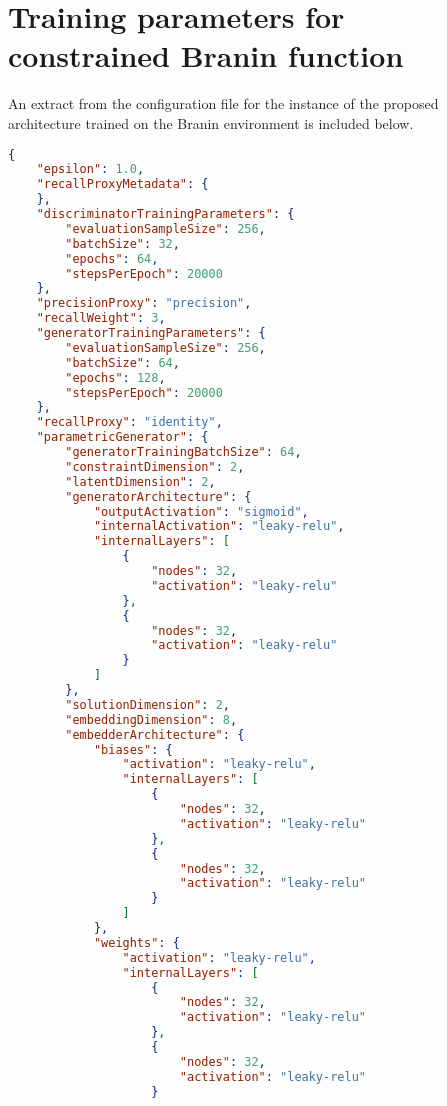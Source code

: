 \documentclass[../main.tex]{subfiles}
\begin{document}
\section{Training parameters for constrained Branin function} \label{appendix:braninTrainingParameters}

An extract from the configuration file for the instance of the proposed architecture trained on the Branin environment is included below.

\begin{lstlisting}[language=json,firstnumber=1,caption={Experimental parameters for training a generator on the constrained Branin function environment.},captionpos=b]
{  
    "epsilon": 1.0,
    "recallProxyMetadata": {
    },
    "discriminatorTrainingParameters": {  
        "evaluationSampleSize": 256,
        "batchSize": 32,
        "epochs": 64,
        "stepsPerEpoch": 20000
    },
    "precisionProxy": "precision",
    "recallWeight": 3,
    "generatorTrainingParameters": {  
        "evaluationSampleSize": 256,
        "batchSize": 64,
        "epochs": 128,
        "stepsPerEpoch": 20000
    },
    "recallProxy": "identity",
    "parametricGenerator": {  
        "generatorTrainingBatchSize": 64,
        "constraintDimension": 2,
        "latentDimension": 2,
        "generatorArchitecture": {  
            "outputActivation": "sigmoid",
            "internalActivation": "leaky-relu",
            "internalLayers": [  
                {  
                    "nodes": 32,
                    "activation": "leaky-relu"
                },
                {  
                    "nodes": 32,
                    "activation": "leaky-relu"
                }
            ]
        },
        "solutionDimension": 2,
        "embeddingDimension": 8,
        "embedderArchitecture": {  
            "biases": {  
                "activation": "leaky-relu",
                "internalLayers": [  
                    {  
                        "nodes": 32,
                        "activation": "leaky-relu"
                    },
                    {  
                        "nodes": 32,
                        "activation": "leaky-relu"
                    }
                ]
            },
            "weights": {  
                "activation": "leaky-relu",
                "internalLayers": [  
                    {  
                        "nodes": 32,
                        "activation": "leaky-relu"
                    },
                    {  
                        "nodes": 32,
                        "activation": "leaky-relu"
                    }

\end{lstlisting}
\end{document}

